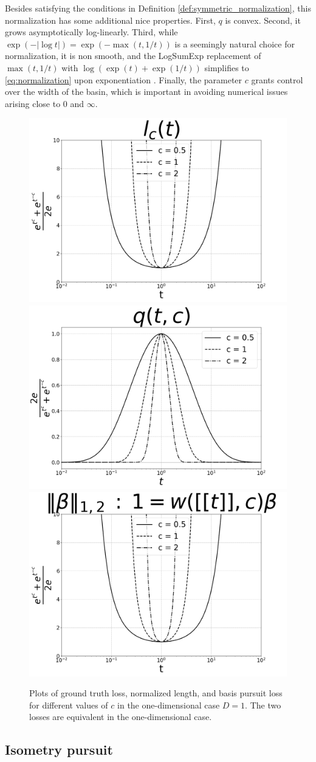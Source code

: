 Besides satisfying the conditions in Definition \ref{def:symmetric_normalization}, this normalization has some additional nice properties.
First, $q$ is convex.
Second, it grows asymptotically log-linearly.
Third, while $\exp(-|\log t|) = \exp(-\max (t, 1/t))$ is a seemingly natural choice for normalization, it is non smooth, and the LogSumExp replacement of $\max (t, 1/t)$ with $ \log (\exp (t ) + \exp(1/t))$ simplifies to \ref{eq:normalization} upon exponentiation \citep{Boyd2004-ql}.
Finally, the parameter $c$ grants control over the width of the basin, which is important in avoiding numerical issues arising close to $0$ and $\infty$.

\begin{figure}
\centering
{}
{\includegraphics[width = .32\textwidth]{../figures/Figure_1a_bw.png}}
\label{fig:gt_loss}
{\includegraphics[width = .32\textwidth]{../figures/Figure_1b_bw.png}}
{\includegraphics[width = .32\textwidth]{../figures/Figure_1c_bw.png}}
\caption{Plots of ground truth loss, normalized length, and basis pursuit loss for different values of $c$ in the one-dimensional case $D = 1$.
The two losses are equivalent in the one-dimensional case.}
\label{fig:losses}
\end{figure}

\subsection{Isometry pursuit}

